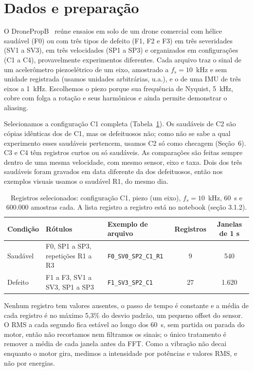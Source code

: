 \documentclass[a4paper]{article}
\begin{document}
\section{Dados e preparação}

O DronePropB~\cite{dataset} reúne ensaios em solo de um drone comercial com hélice saudável (F0) ou com três tipos de defeito (F1, F2 e F3) em três severidades (SV1 a SV3), em três velocidades (SP1 a SP3) e organizados em configurações (C1 a C4), provavelmente experimentos diferentes. Cada arquivo traz o sinal de um acelerômetro piezoelétrico de um eixo, amostrado a $f_s = 10$~kHz e sem unidade registrada (usamos unidades arbitrárias, u.a.), e o de uma IMU de três eixos a 1~kHz. Escolhemos o piezo porque sua frequência de Nyquist, 5~kHz, cobre com folga a rotação e seus harmônicos e ainda permite demonstrar o aliasing.

Selecionamos a configuração C1 completa (Tabela~\ref{tab:registros}). Os saudáveis de C2 são cópias idênticas dos de C1, mas os defeituosos não; como não se sabe a qual experimento esses saudáveis pertencem, usamos C2 só como checagem (Seção~6). C3 e C4 têm registros curtos ou só saudáveis. As comparações são feitas sempre dentro de uma mesma velocidade, com mesmo sensor, eixo e taxa. Dois dos três saudáveis foram gravados em data diferente da dos defeituosos, então nos exemplos visuais usamos o saudável R1, do mesmo dia.

\begin{table}[htbp]
\centering
\caption{Registros selecionados: configuração C1, piezo (um eixo), $f_s = 10$~kHz, 60~s e 600.000 amostras cada. A lista registro a registro está no notebook (seção 3.1.2).}
\label{tab:registros}
\small
\begin{tabular}{lllcc}
\toprule
Condição & Rótulos & Exemplo de arquivo & Registros & Janelas de 1 s \\
\midrule
Saudável & F0, SP1 a SP3, repetições R1 a R3 & \texttt{F0\_SV0\_SP2\_C1\_R1} & 9 & 540 \\
Defeito & F1 a F3, SV1 a SV3, SP1 a SP3 & \texttt{F1\_SV3\_SP2\_C1} & 27 & 1.620 \\
\bottomrule
\end{tabular}
\end{table}

Nenhum registro tem valores ausentes, o passo de tempo é constante e a média de cada registro é no máximo 5,3\% do desvio padrão, um pequeno offset do sensor. O RMS a cada segundo fica estável ao longo dos 60~s, sem partida ou parada do motor, então não recortamos nem filtramos os sinais; o único tratamento é remover a média de cada janela antes da FFT. Como a vibração não decai enquanto o motor gira, medimos a intensidade por potências e valores RMS, e não por energias.
\end{document}
